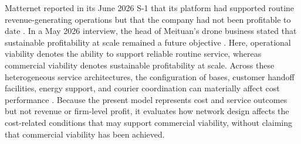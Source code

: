 \documentclass[final,3p,authoryear]{elsarticle}
\begin{document}
Matternet reported in its June 2026 S-1 that its platform had supported routine revenue-generating operations but that the company had not been profitable to date \citep{Matternet2026S1}.
In a May 2026 interview, the head of Meituan's drone business stated that sustainable profitability at scale remained a future objective \citep{Meituan2026ProfitabilityInterview}.
Here, operational viability denotes the ability to support reliable routine service, whereas commercial viability denotes sustainable profitability at scale.
Across these heterogeneous service architectures, the configuration of bases, customer handoff facilities, energy support, and courier coordination can materially affect cost performance \citep{DroneEconomicViabilityReview2025}.
Because the present model represents cost and service outcomes but not revenue or firm-level profit, it evaluates how network design affects the cost-related conditions that may support commercial viability, without claiming that commercial viability has been achieved.
\color{black}




\end{document}
